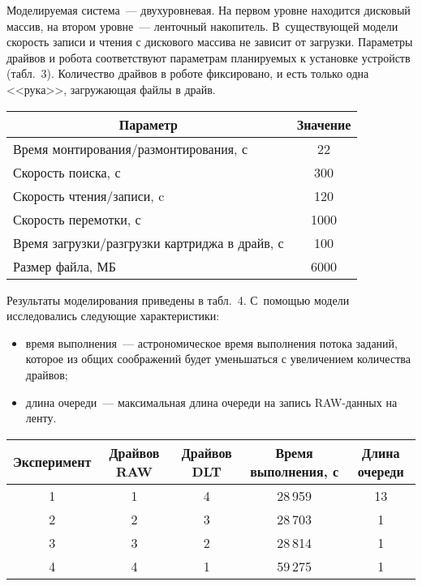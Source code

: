 \begin{multicols}{2}
   Моделируемая система~--- двухуровневая. На первом уровне находится 
дисковый массив, на втором уровне~--- ленточный накопитель. 
В~существующей модели скорость записи и чтения с дискового массива не 
зависит от загрузки. Параметры драйвов и робота соответствуют параметрам 
планируемых к установке устройств (табл.~3). Количество драйвов в роботе 
фиксировано, и есть только одна <<рука>>, загружающая файлы в драйв.
   
   \begin{table*}\small %
   \begin{center}
   \vspace*{2ex}
   
   \tabcolsep=10pt
   \begin{tabular}{|l|c|}
   \hline
\multicolumn{1}{|c|}{Параметр}&Значение\\
\hline
Время монтирования/размонтирования, с&\hphantom{99}22\\
Скорость поиска, с&\hphantom{9}300\\
Скорость чтения/записи, c&\hphantom{9}120\\
Скорость перемотки, с&1000\\
Время загрузки/разгрузки картриджа в драйв, с&\hphantom{9}100\\
Размер файла, МБ&6000\\
\hline
\end{tabular}
\end{center}
\vspace*{-9pt}
\end{table*}

   Результаты моделирования приведены в табл.~4. С~помощью модели 
исследовались следующие характеристики: 
   \begin{itemize}
\item время выполнения~--- астрономическое время выполнения потока 
заданий, которое из общих соображений будет уменьшаться с 
увеличением количества драйвов;
\item длина очереди~--- максимальная длина очереди на запись 
RAW-дан\-ных на ленту. 
\end{itemize}

\begin{table*}\small %
\begin{center}
\vspace*{2ex}

\begin{tabular}{|c|c|c|c|c|}
\hline
Эксперимент&Драйвов RAW&Драйвов DLT&Время выполнения, с&Длина очереди\\
\hline
1&1&4&28\,959&13\hphantom{9}\\
2&2&3&28\,703&1\\
3&3&2&28\,814&1\\
4&4&1&59\,275&1\\
\hline
\end{tabular}
\end{center}
\vspace*{-6pt}
\end{table*}
   

\end{multicols}
